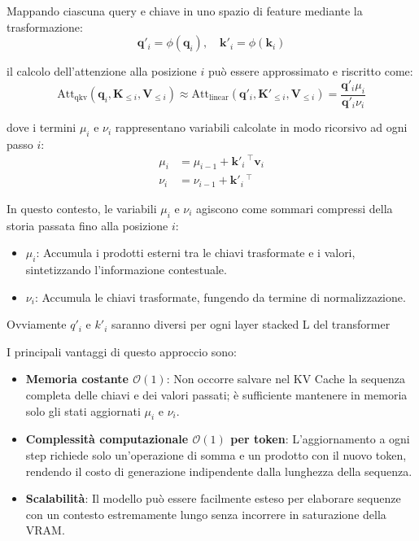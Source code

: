 Mappando ciascuna query e chiave in uno spazio di feature mediante la trasformazione:
\[
\mathbf{q}'_i = \phi(\mathbf{q}_i), \quad \mathbf{k}'_i = \phi(\mathbf{k}_i)
\]

il calcolo dell'attenzione alla posizione $i$ può essere approssimato e riscritto come:
\begin{equation}
\text{Att}_{\text{qkv}}(\mathbf{q}_i, \mathbf{K}_{\le i}, \mathbf{V}_{\le i}) \approx \text{Att}_{\text{linear}}(\mathbf{q}'_i, \mathbf{K}'_{\le i}, \mathbf{V}_{\le i}) = \frac{\mathbf{q}'_i \mu_i}{\mathbf{q}'_i \nu_i}
\end{equation}

dove i termini $\mu_i$ e $\nu_i$ rappresentano variabili calcolate in modo ricorsivo ad ogni passo $i$:
\begin{align}
\mu_i &= \mu_{i-1} + \mathbf{k}'_i\,^\top \mathbf{v}_i \label{eq:linear_attn_mu} \\
\nu_i &= \nu_{i-1} + \mathbf{k}'_i\,^\top \label{eq:linear_attn_nu}
\end{align}

In questo contesto, le variabili $\mu_i$ e $\nu_i$ agiscono come sommari compressi della storia passata fino alla posizione $i$:
\begin{itemize}
    \item \textbf{$\mu_i$}: Accumula i prodotti esterni tra le chiavi trasformate e i valori, sintetizzando l'informazione contestuale.
    \item \textbf{$\nu_i$}: Accumula le chiavi trasformate, fungendo da termine di normalizzazione.
\end{itemize}

Ovviamente $q'_i$ e $k'_i$ saranno diversi per ogni layer stacked L del transformer

I principali vantaggi di questo approccio sono:
\begin{itemize}
    \item \textbf{Memoria costante $\mathcal{O}(1)$}: Non occorre salvare nel KV Cache la sequenza completa delle chiavi e dei valori passati; è sufficiente mantenere in memoria solo gli stati aggiornati $\mu_i$ e $\nu_i$.
    \item \textbf{Complessità computazionale $\mathcal{O}(1)$ per token}: L'aggiornamento a ogni step richiede solo un'operazione di somma e un prodotto con il nuovo token, rendendo il costo di generazione indipendente dalla lunghezza della sequenza.
    \item \textbf{Scalabilità}: Il modello può essere facilmente esteso per elaborare sequenze con un contesto estremamente lungo senza incorrere in saturazione della VRAM.
\end{itemize}



